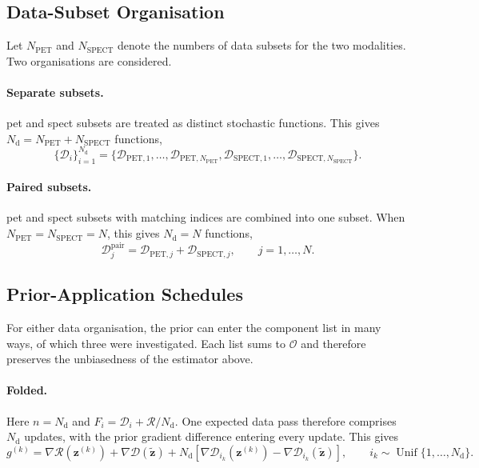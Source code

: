 \subsection{Data-Subset Organisation}
\label{subsec:subset_data_organisation}

Let $N_{\mathrm{PET}}$ and $N_{\mathrm{SPECT}}$ denote the numbers of data subsets for the two modalities. Two organisations are considered.

\paragraph{Separate subsets.}
\gls{pet} and \gls{spect} subsets are treated as distinct stochastic functions. This gives $N_{\mathrm d}=N_{\mathrm{PET}}+N_{\mathrm{SPECT}}$ functions,
\begin{equation}
    \{\mathcal{D}_i\}_{i=1}^{N_{\mathrm d}}
    =
    \{
    \mathcal{D}_{\mathrm{PET},1},\ldots,\mathcal{D}_{\mathrm{PET},N_{\mathrm{PET}}},
    \mathcal{D}_{\mathrm{SPECT},1},\ldots,\mathcal{D}_{\mathrm{SPECT},N_{\mathrm{SPECT}}}
    \}.
    \label{eq:separate_subset_functions}
\end{equation}

\paragraph{Paired subsets.}
\gls{pet} and \gls{spect} subsets with matching indices are combined into one subset. When $N_{\mathrm{PET}}=N_{\mathrm{SPECT}}=N$, this gives $N_{\mathrm d}=N$ functions,
\begin{equation}
    \mathcal{D}^{\mathrm{pair}}_j
    =
    \mathcal{D}_{\mathrm{PET},j}
    +
    \mathcal{D}_{\mathrm{SPECT},j},
    \qquad j=1,\ldots,N.
    \label{eq:paired_subset_functions}
\end{equation}

\subsection{Prior-Application Schedules}
\label{subsec:subset_prior_schedules}

For either data organisation, the prior can enter the component list in many ways, of which three were investigated. Each list sums to $\mathcal{O}$ and therefore preserves the unbiasedness of the estimator above.

\paragraph{Folded.}
Here $n=N_{\mathrm d}$ and $F_i=\mathcal D_i+\mathcal R/N_{\mathrm d}$. One expected data pass therefore comprises $N_{\mathrm d}$ updates, with the prior gradient difference entering every update. This gives
\begin{equation}
    g^{(k)} = \nabla\mathcal R(\bm z^{(k)})
    + \nabla\mathcal D(\widetilde{\bm z})
    + N_{\mathrm d}\!\left[
        \nabla\mathcal D_{i_k}(\bm z^{(k)})
        -\nabla\mathcal D_{i_k}(\widetilde{\bm z})
    \right],
    \qquad i_k\sim\operatorname{Unif}\{1,\ldots,N_{\mathrm d}\}.
    \label{eq:svrg_estimator_general}
\end{equation}

